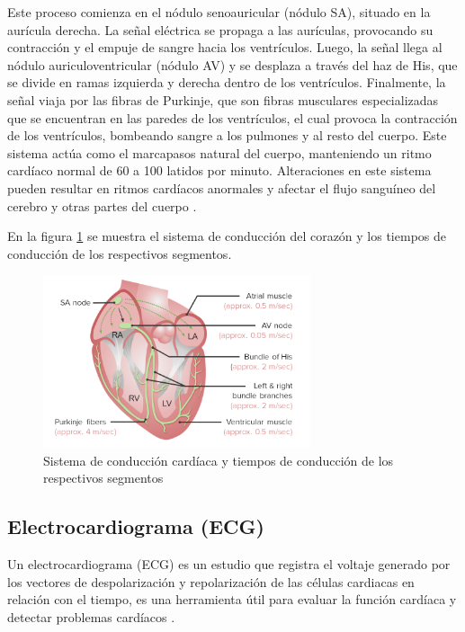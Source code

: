      Este proceso comienza en el nódulo senoauricular (nódulo SA), situado en la aurícula derecha. La señal eléctrica se propaga a las aurículas, provocando su contracción y el empuje de sangre hacia los ventrículos. Luego, la señal llega al nódulo auriculoventricular (nódulo AV) y se desplaza a través del haz de His, que se divide en ramas izquierda y derecha dentro de los ventrículos. Finalmente, la señal viaja por las fibras de Purkinje, que son fibras musculares especializadas que se encuentran en las paredes de los ventrículos, el cual provoca la contracción de los ventrículos, bombeando sangre a los pulmones y al resto del cuerpo. Este sistema actúa como el marcapasos natural del cuerpo, manteniendo un ritmo cardíaco normal de 60 a 100 latidos por minuto. Alteraciones en este sistema pueden resultar en ritmos cardíacos anormales y afectar el flujo sanguíneo del cerebro y otras partes del cuerpo \cite{SistemaConduccionMSD}.

     En la figura \ref{fig:sistemaConduccion} se muestra el sistema de conducción del corazón y los tiempos de conducción de los respectivos segmentos.

    \begin{figure}[H]
        \centering
        \includegraphics[width=0.7\textwidth]{img/Marco/sistemaConduccion.png}
        \caption[Sistema de conducción cardíaca y tiempos de conducción de los respectivos segmentos]{Sistema de conducción cardíaca y tiempos de conducción de los respectivos segmentos\footnotemark}
        \label{fig:sistemaConduccion}
    \end{figure}

    \subsection{Electrocardiograma (ECG)}
    Un electrocardiograma (ECG) es un estudio que registra el voltaje generado por los vectores de despolarización y repolarización de las células cardiacas en relación con el tiempo, es una herramienta útil para evaluar la función cardíaca y detectar problemas cardíacos \cite{ECG_Definicion}.

